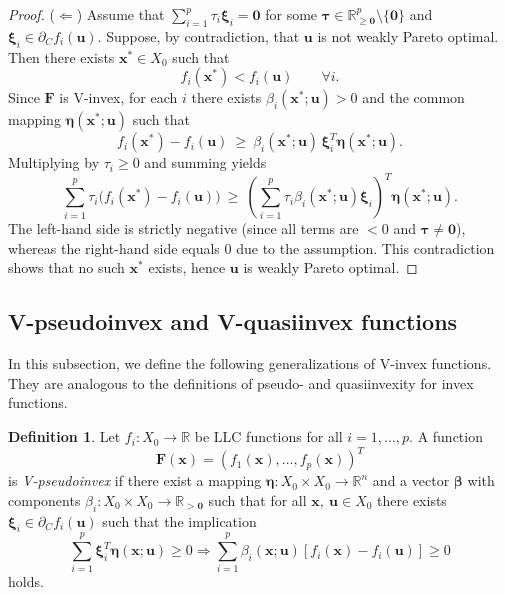 \documentclass{article}
\theoremstyle{definition}
\newtheorem{maar}{Definition}[section]
\begin{document}
\begin{proof}
($\Leftarrow$)
Assume that $\sum_{i=1}^p \tau_i \boldsymbol\xi_i=\boldsymbol 0$ for some
$\boldsymbol\tau\in\mathbb{R}^p_{\ge \boldsymbol 0}\setminus\{\boldsymbol 0\}$ and $\boldsymbol\xi_i\in\partial_C f_i(\boldsymbol u)$.
Suppose, by contradiction, that $\boldsymbol u$ is not weakly Pareto optimal. Then there exists $\boldsymbol x^*\in X_0$ such that
\[
f_i(\boldsymbol x^*) < f_i(\boldsymbol u)\qquad \forall i.
\]
Since $\boldsymbol F$ is V-invex, for each $i$ there exists $\beta_i(\boldsymbol x^*;\boldsymbol u)>0$ and the common mapping
$\boldsymbol \eta(\boldsymbol x^*;\boldsymbol u)$ such that
\[
f_i(\boldsymbol x^*)-f_i(\boldsymbol u)\ \ge\ \beta_i(\boldsymbol x^*;\boldsymbol u)\,\boldsymbol\xi_i^T\boldsymbol\eta(\boldsymbol x^*;\boldsymbol u).
\]
Multiplying by $\tau_i\ge 0$ and summing yields
\[
\sum_{i=1}^p \tau_i\bigl(f_i(\boldsymbol x^*)-f_i(\boldsymbol u)\bigr)
\ \ge\
\left(\sum_{i=1}^p \tau_i \beta_i(\boldsymbol x^*;\boldsymbol u)\boldsymbol\xi_i\right)^T\boldsymbol\eta(\boldsymbol x^*;\boldsymbol u).
\]
The left-hand side is strictly negative (since all terms are $<0$ and $\boldsymbol\tau\neq \boldsymbol 0$),
whereas the right-hand side equals $0$ due to the assumption.
This contradiction shows that no such $\boldsymbol x^*$ exists, hence $\boldsymbol u$ is weakly Pareto optimal.
\end{proof}


\subsection{V-pseudoinvex and V-quasiinvex functions}
In this subsection, we define the following generalizations of V-invex functions. They are analogous to the definitions of pseudo- and quasiinvexity for invex functions.

\begin{maar}\label{q}
   {\cite{MisGio}} Let $f_i : X_0 \rightarrow \mathbb R$ be LLC functions for all $i=1,\dots,p$. A function $$\boldsymbol F(\boldsymbol x) = (f_1(\boldsymbol x),\dots,f_p(\boldsymbol x))^T$$ is \emph{V-pseudoinvex} if there exist a mapping $\boldsymbol \eta : X_0 \times X_0 \rightarrow \mathbb R^n$ and a vector $\boldsymbol \beta$ with components $\beta_i : X_0 \times X_0 \rightarrow \mathbb R_{> \boldsymbol 0}$ such that for all $\boldsymbol x,\ \boldsymbol u \in X_0$  there exists $\boldsymbol \xi_i \in \partial_C f_i(\boldsymbol u)$ such that the implication
$$\sum_{i=1}^p  \boldsymbol \xi_i^T \boldsymbol \eta(\boldsymbol x; \boldsymbol u) \geq 0 \Longrightarrow \sum_{i=1}^p \beta_i(\boldsymbol x; \boldsymbol u)[f_i(\boldsymbol x) - f_i(\boldsymbol u)] \geq 0$$
holds.
\end{maar}
\end{document}
